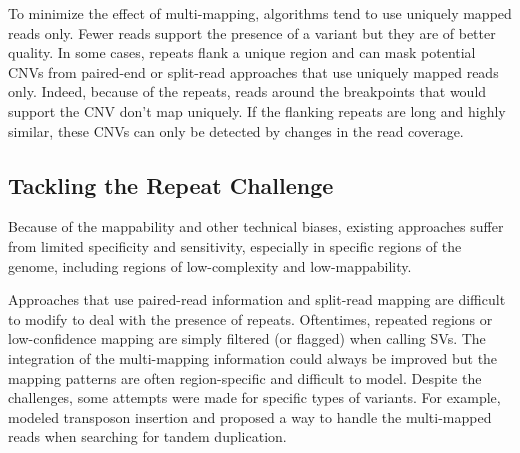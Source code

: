 To minimize the effect of multi-mapping, algorithms tend to use uniquely mapped reads only.
Fewer reads support the presence of a variant but they are of better quality.
In some cases, repeats flank a unique region and can mask potential CNVs from paired-end or split-read approaches that use uniquely mapped reads only.
Indeed, because of the repeats, reads around the breakpoints that would support the CNV don't map uniquely. 
If the flanking repeats are long and highly similar, these CNVs can only be detected by changes in the read coverage.

\subsection{Tackling the Repeat Challenge}
\label{sec:repmeth}

Because of the mappability and other technical biases, existing approaches suffer from limited specificity and sensitivity\cite{Mills2011,Alkan2011}, especially in specific regions of the genome, including regions of low-complexity and low-mappability\cite{Treangen2011,Teo2012}.

Approaches that use paired-read information and split-read mapping are difficult to modify to deal with the presence of repeats.
Oftentimes, repeated regions or low-confidence mapping are simply filtered (or flagged) when calling SVs.
The integration of the multi-mapping information could always be improved but the mapping patterns are often region-specific and difficult to model.
Despite the challenges, some attempts were made for specific types of variants.
For example, \citet{Hormozdiari2010} modeled transposon insertion and \citet{He2011} proposed a way to handle the multi-mapped reads when searching for tandem duplication.

